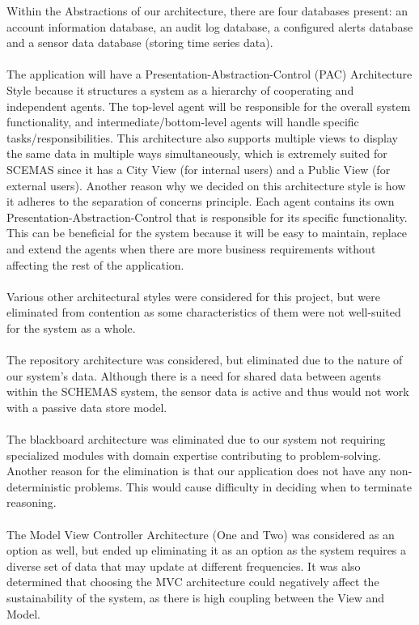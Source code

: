 \documentclass[]{article}
\begin{document}
Within the Abstractions of our architecture, there are four databases present: an account information database, an audit log database, a configured alerts database and a sensor data database (storing time series data).
\\\\
The application will have a Presentation-Abstraction-Control (PAC) Architecture Style because it structures a system as a hierarchy of cooperating and independent agents. The top-level agent will be responsible for the overall system functionality, and intermediate/bottom-level agents will handle specific tasks/responsibilities. This architecture also supports multiple views to display the same data in multiple ways simultaneously, which is extremely suited for SCEMAS since it has a City View (for internal users) and a Public View (for external users). Another reason why we decided on this architecture style is how it adheres to the separation of concerns principle. Each agent contains its own Presentation-Abstraction-Control that is responsible for its specific functionality. This can be beneficial for the system because it will be easy to maintain, replace and extend the agents when there are more business requirements without affecting the rest of the application.
\\\\
Various other architectural styles were considered for this project, but were eliminated from contention as some characteristics of them were not well-suited for the system as a whole.
\\\\
The repository architecture was considered, but eliminated due to the nature of our system’s data. Although there is a need for shared data between agents within the SCHEMAS system, the sensor data is active and thus would not work with a passive data store model.
\\\\
The blackboard architecture was eliminated due to our system not requiring specialized modules with domain expertise contributing to problem-solving. Another reason for the elimination is that our application does not have any non-deterministic problems. This would cause difficulty in deciding when to terminate reasoning.
\\\\
The Model View Controller Architecture (One and Two) was considered as an option as well, but ended up eliminating it as an option as the system requires a diverse set of data that may update at different frequencies. It was also determined that choosing the MVC architecture could negatively affect the sustainability of the system, as there is high coupling between the View and Model.
\end{document}
